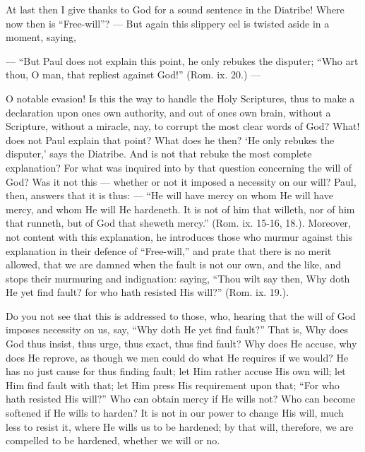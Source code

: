 At last then I give thanks to God for a sound sentence in the Diatribe! Where now then is “Free-will”? — But again this slippery eel is twisted aside in a moment, saying,

— “But Paul does not explain this point, he only rebukes the disputer; “Who art thou, O man, that repliest against God!” (Rom. ix. 20.) —

O notable evasion! Is this the way to handle the Holy Scriptures, thus to make a declaration upon ones own authority, and out of ones own brain, without a Scripture, without a miracle, nay, to corrupt the most clear words of God? What! does not Paul explain that point? What does he then? ‘He only rebukes the disputer,’ says the Diatribe. And is not that rebuke the most complete explanation? For what was inquired into by that question concerning the will of God? Was it not this — whether or not it imposed a necessity on our will? Paul, then, answers that it is thus: — “He will have mercy on whom He will have mercy, and whom He will He hardeneth. It is not of him that willeth, nor of him that runneth, but of God that sheweth mercy.” (Rom. ix. 15-16, 18.). Moreover, not content with this explanation, he introduces those who murmur against this explanation in their defence of “Free-will,” and prate that there is no merit allowed, that we are damned when the fault is not our own, and the like, and stops their murmuring and indignation: saying, “Thou wilt say then, Why doth He yet find fault? for who hath resisted His will?” (Rom. ix. 19.).

Do you not see that this is addressed to those, who, hearing that the will of God imposes necessity on us, say, “Why doth He yet find fault?” That is, Why does God thus insist, thus urge, thus exact, thus find fault? Why does He accuse, why does He reprove, as though we men could do what He requires if we would? He has no just cause for thus finding fault; let Him rather accuse His own will; let Him find fault with that; let Him press His requirement upon that; “For who hath resisted His will?” Who can obtain mercy if He wills not? Who can become softened if He wills to harden? It is not in our power to change His will, much less to resist it, where He wills us to be hardened; by that will, therefore, we are compelled to be hardened, whether we will or no.

